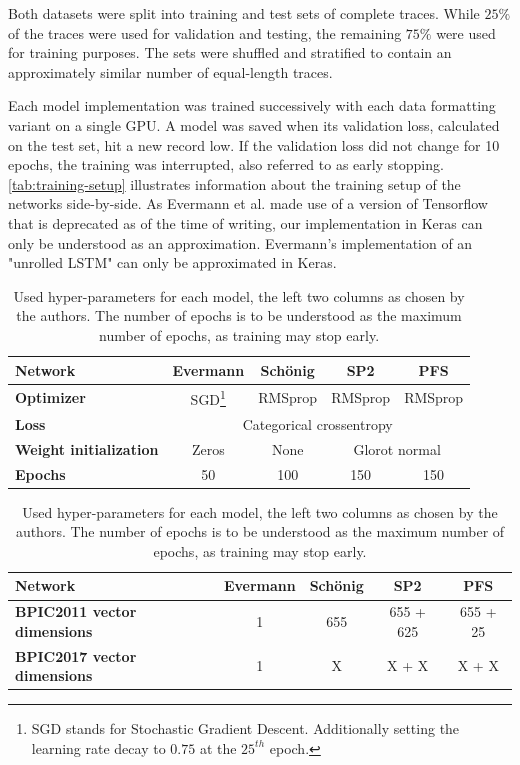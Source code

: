 Both datasets were split into training and test sets of complete traces. While $25\%$ of the traces were used for validation and testing, the remaining $75\%$ were used for training purposes. The sets were shuffled and stratified to contain an approximately similar number of equal-length traces.

Each model implementation was trained successively with each data formatting variant on a single GPU. A model was saved when its validation loss, calculated on the test set, hit a new record low. If the validation loss did not change for 10 epochs, the training was interrupted, also referred to as early stopping. \autoref{tab:training-setup} illustrates information about the training setup of the networks side-by-side. As Evermann et al. made use of a version of Tensorflow that is deprecated as of the time of writing, our implementation in Keras can only be understood as an approximation. Evermann's implementation of an "unrolled LSTM" can only be approximated in Keras.

\begin{table}[ht!]
    \centering
    \begin{tabular}{lcccc}
        \textbf{Network} & \textbf{Evermann} & \textbf{Schönig} & \textbf{SP2} & \textbf{PFS}\\
        \hline
        \textbf{Optimizer} & SGD\footnote{SGD stands for Stochastic Gradient Descent. Additionally setting the learning rate decay to $0.75$ at the $25^{th}$ epoch.} & RMSprop  & RMSprop & RMSprop\\
        \textbf{Loss}    &\multicolumn{4}{c}{Categorical crossentropy}\\
        \textbf{Weight initialization} & Zeros & None & \multicolumn{2}{c}{Glorot normal}\\
        \textbf{Epochs}  & 50 & 100 & 150 & 150\\
    \end{tabular}
    \caption{Used hyper-parameters for each model, the left two columns as chosen by the authors. The number of epochs is to be understood as the maximum number of epochs, as training may stop early.}
    \label{tab:training-setup}
\end{table}
\begin{table}[ht!]
    \centering
    \begin{tabular}{lcccc}
        \textbf{Network} & \textbf{Evermann} & \textbf{Schönig} & \textbf{SP2} & \textbf{PFS}\\
        \hline
        \textbf{BPIC2011 vector dimensions} & 1 & 655 & 655 + 625 & 655 + 25 \\
        \textbf{BPIC2017 vector dimensions} & 1 & X & X + X & X + X \\
    \end{tabular}
    \caption{Used hyper-parameters for each model, the left two columns as chosen by the authors. The number of epochs is to be understood as the maximum number of epochs, as training may stop early.}
    \label{tab:network-info}
\end{table}


